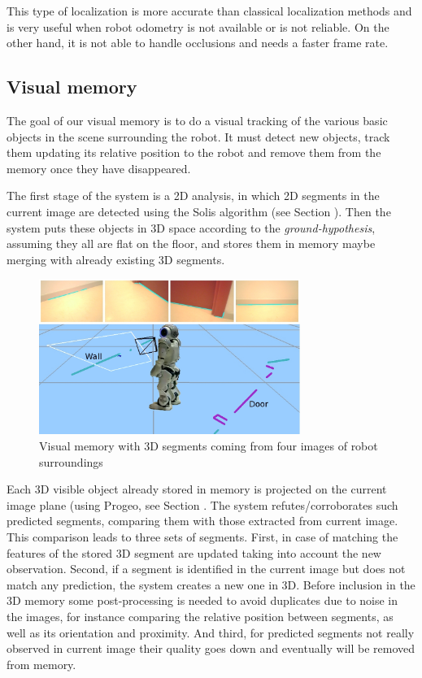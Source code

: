 \documentclass[twocolumn]{svjour3}          %
\begin{document}
This type of localization is more accurate than classical localization methods and is very useful when robot odometry is not available or is not reliable. On the other hand, it is not able to handle occlusions and needs a faster frame rate.

\subsection{Visual memory}

The goal of our visual memory is to do a visual tracking of the various basic objects in the scene surrounding the robot. It must detect new objects, track them updating its relative position to the robot and remove them from the memory once they have disappeared.

The first stage of the system is a 2D analysis, in which 2D segments in the current image are detected using the Solis algorithm \cite{solis09} (see Section \label{subsec:visionlib}). Then the system puts these objects in 3D space according to the \textit{ground-hypothesis}, assuming they all are flat on the floor, and stores them in memory maybe merging with already existing 3D segments. 

\begin{figure}[h!]
\includegraphics[width=8.5cm]{figs/experimentoReal.jpg}
\caption{Visual memory with 3D segments coming from four images of robot surroundings}
\label{fig:memory}
\end{figure}

Each 3D visible object already stored in memory is projected on the current image plane (using Progeo, see Section \label{subsec:progeo}. The system refutes/corroborates such predicted segments, comparing them with those extracted from current image. This comparison leads to three sets of segments. First, in case of matching the features of the stored 3D segment are updated taking into account the new observation. Second, if a segment is identified in the current image but does not match any prediction, the system creates a new one in 3D. Before inclusion in the 3D memory some post-processing is needed to avoid duplicates due to noise in the images, for instance comparing the relative position between segments, as well as its orientation and proximity. And third, for predicted segments not really observed in current image their quality goes down and eventually will be removed from memory.
\end{document}
